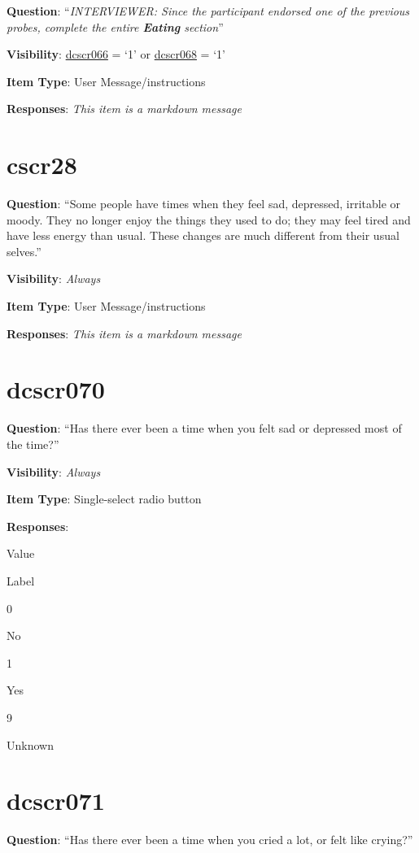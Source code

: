 \documentclass[]{book}
\begin{document}
\textbf{Question}: ``\emph{INTERVIEWER: Since the participant endorsed one of the previous probes, complete the entire \textbf{Eating} section}''

\textbf{Visibility}: \protect\hyperlink{dcscr066}{dcscr066} = `1' or \protect\hyperlink{dcscr068}{dcscr068} = `1'

\textbf{Item Type}: User Message/instructions

\textbf{Responses}: \emph{This item is a markdown message}

\hypertarget{cscr28}{%
\section{cscr28}\label{cscr28}}

\textbf{Question}: ``Some people have times when they feel sad, depressed, irritable or moody. They no longer enjoy the things they used to do; they may feel tired and have less energy than usual. These changes are much different from their usual selves.''

\textbf{Visibility}: \emph{Always}

\textbf{Item Type}: User Message/instructions

\textbf{Responses}: \emph{This item is a markdown message}

\hypertarget{dcscr070}{%
\section{dcscr070}\label{dcscr070}}

\textbf{Question}: ``Has there ever been a time when you felt sad or depressed most of the time?''

\textbf{Visibility}: \emph{Always}

\textbf{Item Type}: Single-select radio button

\textbf{Responses}:

Value

Label

0

No

1

Yes

9

Unknown

\hypertarget{dcscr071}{%
\section{dcscr071}\label{dcscr071}}

\textbf{Question}: ``Has there ever been a time when you cried a lot, or felt like crying?''
\end{document}
